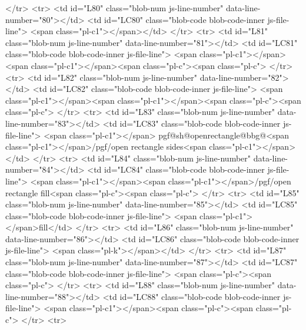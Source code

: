{{      </tr>
      <tr>
        <td id="L80" class="blob-num js-line-number" data-line-number="80"></td>
        <td id="LC80" class="blob-code blob-code-inner js-file-line">      <span class="pl-c1">\pgf@xb\pgf@x\pgf@yb\pgf@y</span></td>
      </tr>
      <tr>
        <td id="L81" class="blob-num js-line-number" data-line-number="81"></td>
        <td id="LC81" class="blob-code blob-code-inner js-file-line">      <span class="pl-c1">\pgfextract@process\NW</span>{<span class="pl-c1">\pgf@x\pgf@xa\pgf@y\pgf@yb</span>}<span class="pl-c"><span class="pl-c">%
      </tr>
      <tr>
        <td id="L82" class="blob-num js-line-number" data-line-number="82"></td>
        <td id="LC82" class="blob-code blob-code-inner js-file-line">      <span class="pl-c1">\pgfextract@process\SE</span>{<span class="pl-c1">\pgf@x\pgf@xb\pgf@y\pgf@ya</span>}<span class="pl-c"><span class="pl-c">%
      </tr>
      <tr>
        <td id="L83" class="blob-num js-line-number" data-line-number="83"></td>
        <td id="LC83" class="blob-code blob-code-inner js-file-line">      <span class="pl-c1">\csname</span> pgf@sh@openrectangle@bbg@<span class="pl-c1">\pgfkeysvalueof</span>{/pgf/open rectangle sides}<span class="pl-c1">\endcsname</span></td>
      </tr>
      <tr>
        <td id="L84" class="blob-num js-line-number" data-line-number="84"></td>
        <td id="LC84" class="blob-code blob-code-inner js-file-line">      <span class="pl-c1">\pgfsetfillcolor</span>{<span class="pl-c1">\pgfkeysvalueof</span>{/pgf/open rectangle fill}}<span class="pl-c"><span class="pl-c">%
      </tr>
      <tr>
        <td id="L85" class="blob-num js-line-number" data-line-number="85"></td>
        <td id="LC85" class="blob-code blob-code-inner js-file-line">      <span class="pl-c1">\pgfusepath</span>{fill}</td>
      </tr>
      <tr>
        <td id="L86" class="blob-num js-line-number" data-line-number="86"></td>
        <td id="LC86" class="blob-code blob-code-inner js-file-line">    <span class="pl-k">\fi</span></td>
      </tr>
      <tr>
        <td id="L87" class="blob-num js-line-number" data-line-number="87"></td>
        <td id="LC87" class="blob-code blob-code-inner js-file-line">  }<span class="pl-c"><span class="pl-c">%
      </tr>
      <tr>
        <td id="L88" class="blob-num js-line-number" data-line-number="88"></td>
        <td id="LC88" class="blob-code blob-code-inner js-file-line">  <span class="pl-c1">\backgroundpath</span>{<span class="pl-c"><span class="pl-c">%
      </tr>
      <tr>
}}
